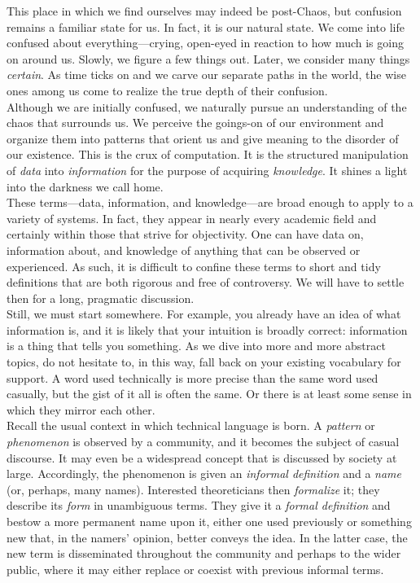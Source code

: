 This place in which we find ourselves may indeed be post-Chaos, but confusion remains a familiar state for us. In fact, it is our natural state. We come into life confused about everything---crying, open-eyed in reaction to how much is going on around us. Slowly, we figure a few things out. Later, we consider many things \textit{certain}. As time ticks on and we carve our separate paths in the world, the wise ones among us come to realize the true depth of their confusion. \\

Although we are initially confused, we naturally pursue an understanding of the chaos that surrounds us. We perceive the goings-on of our environment and organize them into patterns that orient us and give meaning to the disorder of our existence. This is the crux of computation. It is the structured manipulation of \textit{data} into \textit{information} for the purpose of acquiring \textit{knowledge}. It shines a light into the darkness we call home. \\

These terms---data, information, and knowledge---are broad enough to apply to a variety of systems. In fact, they appear in nearly every academic field and certainly within those that strive for objectivity. One can have data on, information about, and knowledge of anything that can be observed or experienced. As such, it is difficult to confine these terms to short and tidy definitions that are both rigorous and free of controversy. We will have to settle then for a long, pragmatic discussion. \\

Still, we must start somewhere. For example, you already have an idea of what information is, and it is likely that your intuition is broadly correct: information is a thing that tells you something. As we dive into more and more abstract topics, do not hesitate to, in this way, fall back on your existing vocabulary for support. A word used technically is more precise than the same word used casually, but the gist of it all is often the same. Or there is at least some sense in which they mirror each other. \\

Recall the usual context in which technical language is born. A \textit{pattern} or \textit{phenomenon} is observed by a community, and it becomes the subject of casual discourse. It may even be a widespread concept that is discussed by society at large. Accordingly, the phenomenon is given an \textit{informal definition} and a \textit{name} (or, perhaps, many names). Interested theoreticians then \textit{formalize} it; they describe its \textit{form} in unambiguous terms. They give it a \textit{formal definition} and bestow a more permanent name upon it, either one used previously or something new that, in the namers' opinion, better conveys the idea. In the latter case, the new term is disseminated throughout the community and perhaps to the wider public, where it may either replace or coexist with previous informal terms. \\

